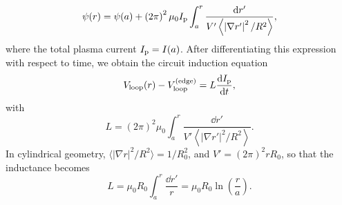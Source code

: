 \documentclass{notes}
\newcommand{\Ip}{I_{\rm p}}
\newcommand{\Vl}{V_{\rm loop}}
\newcommand{\Vle}{\Vl^{({\rm edge})}}
\begin{document}
    \begin{equation}
        \psi(r) = \psi(a) + \left(2\pi\right)^2\mu_0\Ip\int_a^r\frac{\dd r'}
        {V'\left\langle\left|\nabla r'\right|^2/R^2\right\rangle},
    \end{equation}
    where the total plasma current $\Ip = I(a)$. After differentiating this
    expression with respect to time, we obtain the circuit induction equation
    \begin{equation}
        \Vl(r)-\Vle = L\frac{\dd\Ip}{\dd t},
    \end{equation}
    with
    \begin{equation}
        L = \left(2\pi\right)^2\mu_0\int_a^r\frac{\dd r'}
        {V'\left\langle\left|\nabla r'\right|^2/R^2\right\rangle}.
    \end{equation}
    In cylindrical geometry, $\langle|\nabla r|^2/R^2\rangle = 1/R_0^2$, and
    $V' = \left(2\pi\right)^2rR_0$, so that the inductance becomes
    \begin{equation}
        L = \mu_0R_0\int_a^r\frac{\dd r'}{r} = \mu_0 R_0 \ln\left(\frac{r}{a}\right).
    \end{equation}
\end{document}
